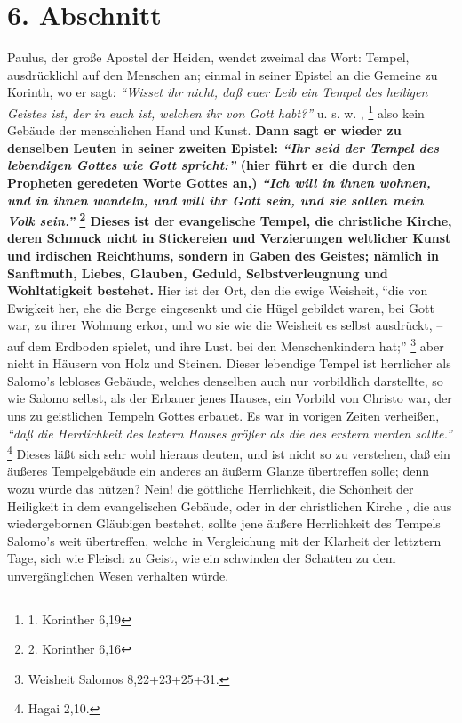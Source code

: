 \section{6. Abschnitt} \label{kap5_ab6}

  
Paulus, der große Apostel der Heiden, wendet zweimal das Wort: Tempel,
ausdrücklichl auf den Menschen an; einmal in seiner Epistel an die Gemeine zu
Korinth, wo er sagt:
\textit{"`Wisset ihr nicht, daß euer Leib ein Tempel des heiligen
Geistes ist, der in euch ist, welchen ihr von Gott habt?"'} u. s. w. ,
\footnote{1. Korinther 6,19}
also kein Gebäude der menschlichen Hand und Kunst. \textbf{Dann sagt er
wieder zu denselben Leuten in seiner zweiten Epistel:
\textit{"`Ihr seid der Tempel des lebendigen Gottes wie Gott spricht:"'} (hier
führt er die durch den Propheten
geredeten Worte Gottes an,)
\textit{"`Ich will in ihnen wohnen, und in ihnen wandeln, und will ihr Gott
sein, und sie sollen mein Volk sein."'}
\footnote{2. Korinther 6,16}
Dieses ist der
evangelische Tempel, die christliche Kirche, deren
Schmuck nicht in Stickereien
und Verzierungen weltlicher Kunst und irdischen Reichthums, sondern in Gaben des
Geistes; nämlich in Sanftmuth, Liebes, Glauben, Geduld,
Selbstverleugnung und
Wohltatigkeit bestehet.} Hier ist der Ort, den die ewige Weisheit,  "`die von
Ewigkeit her, ehe die Berge eingesenkt und die Hügel gebildet waren, bei Gott
war, zu ihrer Wohnung erkor, und wo sie wie die Weisheit es selbst ausdrückt, --
auf dem Erdboden spielet, und ihre Lust. bei den Menschenkindern
hat;"'
\footnote{Weisheit Salomos 8,22+23+25+31.}
aber nicht in Häusern von Holz
und Steinen. Dieser lebendige Tempel ist herrlicher als Salomo's lebloses
Gebäude, welches denselben auch nur vorbildlich darstellte, so wie Salomo
selbst, als der Erbauer jenes Hauses, ein Vorbild von Christo war, der uns zu
geistlichen Tempeln Gottes erbauet. Es war in vorigen Zeiten verheißen,
\textit{"`daß die Herrlichkeit des leztern Hauses größer als die des erstern
werden
sollte."'}
\footnote{Hagai 2,10.}
Dieses läßt sich sehr wohl hieraus deuten, und
ist nicht so zu verstehen, daß ein äußeres Tempelgebäude ein anderes an äußerm
Glanze übertreffen solle; denn wozu würde das nützen? Nein! die göttliche
Herrlichkeit, die Schönheit der Heiligkeit in dem evangelischen Gebäude, oder in
der christlichen Kirche ,
die aus wiedergebornen  Gläubigen bestehet, sollte jene
äußere Herrlichkeit des Tempels Salomo’s weit übertreffen, welche in
Vergleichung mit der Klarheit der lettztern Tage, sich wie Fleisch zu Geist, wie
ein schwinden der Schatten zu dem unvergänglichen Wesen verhalten würde.

